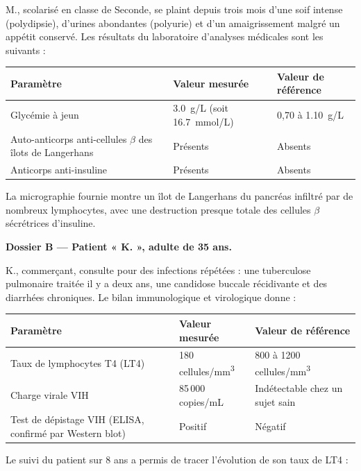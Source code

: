 \documentclass[11pt]{article}
\newcommand{\cle}[1]{{\popxbold\color{popdark}#1}}
\begin{document}
M., scolarisé en classe de Seconde, se plaint depuis trois mois d'une \cle{soif intense} (polydipsie), d'urines abondantes (polyurie) et d'un amaigrissement malgré un appétit conservé. Les résultats du laboratoire d'analyses médicales sont les suivants :

\begin{center}
\begin{tabularx}{\linewidth}{|l|X|X|}
\hline
\rowcolor{popblueL} \textbf{Paramètre} & \textbf{Valeur mesurée} & \textbf{Valeur de référence} \\
\hline
Glycémie à jeun & \SI{3,0}{g/L} (soit \SI{16,7}{mmol/L}) & 0,70 à \SI{1,10}{g/L} \\
\hline
Auto-anticorps anti-cellules $\beta$ des îlots de Langerhans & Présents & Absents \\
\hline
Anticorps anti-insuline & Présents & Absents \\
\hline
\end{tabularx}
\end{center}

La micrographie fournie montre un îlot de Langerhans du pancréas \cle{infiltré par de nombreux lymphocytes}, avec une destruction presque totale des cellules $\beta$ sécrétrices d'insuline.

\textbf{Dossier B — Patient « K. », adulte de 35 ans.}

K., commerçant, consulte pour des infections répétées : une \cle{tuberculose} pulmonaire traitée il y a deux ans, une \cle{candidose} buccale récidivante et des diarrhées chroniques. Le bilan immunologique et virologique donne :

\begin{center}
\begin{tabularx}{\linewidth}{|l|X|X|}
\hline
\rowcolor{popblueL} \textbf{Paramètre} & \textbf{Valeur mesurée} & \textbf{Valeur de référence} \\
\hline
Taux de lymphocytes T4 (LT4) & 180 cellules/mm\textsuperscript{3} & 800 à 1200 cellules/mm\textsuperscript{3} \\
\hline
Charge virale VIH & 85\,000 copies/mL & Indétectable chez un sujet sain \\
\hline
Test de dépistage VIH (ELISA, confirmé par Western blot) & Positif & Négatif \\
\hline
\end{tabularx}
\end{center}

Le suivi du patient sur 8 ans a permis de tracer l'évolution de son taux de LT4 :
\end{document}
